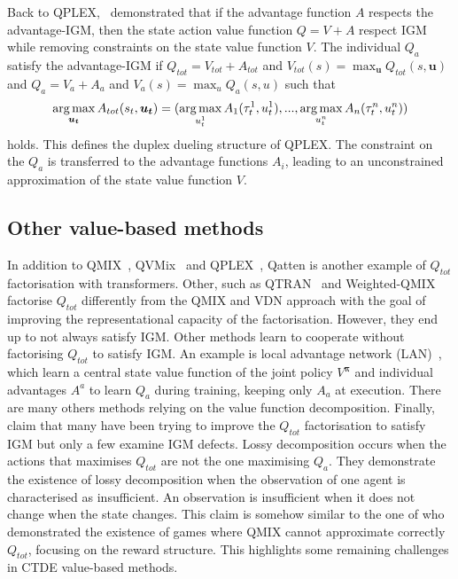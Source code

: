 Back to QPLEX,~\citet{wang2021qplex} demonstrated that if the advantage function $A$ respects the advantage-IGM, then the state action value function $Q = V + A$ respect IGM while removing constraints on the state value function $V$.
The individual $Q_a$ satisfy the advantage-IGM if $Q_{tot}=V_{tot}+A_{tot}$ and $V_{tot}(s)=\max_{\mathbf{u}} Q_{tot}(s, \mathbf{u})$ and $Q_a=V_a+A_a$ and $V_a(s)=\max_{u} Q_a(s, u)$ such that 
\begin{equation}
    \argmax_{\mathbf{u_t}} A_{tot}(s_t, \mathbf{u_t}) =(\argmax_{u_t^{1}} A_{1}(\tau_t^{1}, u_t^{1}),...,\argmax_{u_t^{n}} A_{n}(\tau_t^{n}, u_t^{n}))    
\label{eq:ch3_adv_igm}
\end{equation}
holds.
This defines the duplex dueling structure of QPLEX.
The constraint on the $Q_a$ is transferred to the advantage functions $A_i$, leading to an unconstrained approximation of the state value function $V$.

\subsection{Other value-based methods}
In addition to QMIX~\citep{Rashid2018}, QVMix~\citep{leroy2020qvmix} and QPLEX~\citep{wang2021qplex}, Qatten \citep{yang2020qatten} is another example of $Q_{tot}$ factorisation with transformers.
Other, such as QTRAN~\citep{Son2019QTRAN:Learning} and Weighted-QMIX~\citep{rashid2020weighted} factorise $Q_{tot}$ differently from the QMIX and VDN approach with the goal of improving the representational capacity of the factorisation.
However, they end up to not always satisfy IGM.
Other methods learn to cooperate without factorising $Q_{tot}$ to satisfy IGM.
An example is local advantage network (LAN)~\citep{avalos2023local}, which learn a central state value function of the joint policy $V^{\mathbf{\pi}}$ and individual advantages $A^a$ to learn $Q_a$ during training, keeping only $A_a$ at execution.
There are many others methods relying on the value function decomposition.
Finally, \cite{hong_rethinkigm} claim that many have been trying to improve the $Q_{tot}$ factorisation to satisfy IGM but only a few examine IGM defects.
Lossy decomposition occurs when the actions that maximises $Q_{tot}$ are not the one maximising $Q_a$.
They demonstrate the existence of lossy decomposition when the observation of one agent is characterised as insufficient.
An observation is insufficient when it does not change when the state changes. 
This claim is somehow similar to the one of \cite{Mahajan2019MAVEN:Exploration} who demonstrated the existence of games where QMIX cannot approximate correctly $Q_{tot}$, focusing on the reward structure.
This highlights some remaining challenges in CTDE value-based methods.

